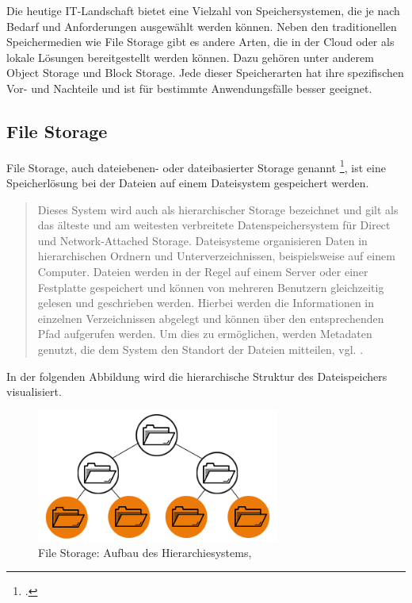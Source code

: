 Die heutige IT-Landschaft bietet eine Vielzahl von Speichersystemen, die je nach Bedarf und Anforderungen ausgewählt werden können. Neben den traditionellen Speichermedien wie File Storage gibt es andere Arten, die in der Cloud oder als lokale Lösungen bereitgestellt werden können. Dazu gehören unter anderem Object Storage und Block Storage. Jede dieser Speicherarten hat ihre spezifischen Vor- und Nachteile und ist für bestimmte Anwendungsfälle besser geeignet. 
 
\subsection{File Storage}

File Storage, auch dateiebenen- oder dateibasierter Storage genannt \footcite{redHat-storage}, ist eine Speicherlösung bei der Dateien auf einem Dateisystem gespeichert werden. 

\begin{quote}
	Dieses System wird auch als hierarchischer Storage bezeichnet und gilt als das älteste und am weitesten verbreitete Datenspeichersystem für Direct und Network-Attached Storage. Dateisysteme organisieren Daten in hierarchischen Ordnern und Unterverzeichnissen, beispielsweise auf einem Computer. Dateien werden in der Regel auf einem Server oder einer Festplatte gespeichert und können von mehreren Benutzern gleichzeitig gelesen und geschrieben werden. Hierbei werden die Informationen in einzelnen Verzeichnissen abgelegt und können über den entsprechenden Pfad aufgerufen werden. Um dies zu ermöglichen, werden Metadaten genutzt, die dem System den Standort der Dateien mitteilen, vgl. \citeauthor{redHat-storage}.
\end{quote}

In der folgenden Abbildung wird die hierarchische Struktur des Dateispeichers visualisiert.

\begin{figure}[h]
\centering
	\includegraphics[width=8cm,keepaspectratio]{Pictures/FileStorageHierarchy.png}
	\caption{File Storage: Aufbau des Hierarchiesystems, }
\end{figure}

